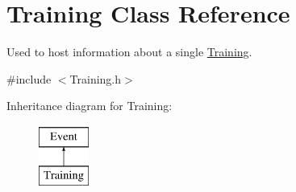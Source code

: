 \hypertarget{class_training}{}\section{Training Class Reference}
\label{class_training}


Used to host information about a single \hyperlink{class_training}{Training}.  




{\ttfamily \#include $<$Training.\+h$>$}

Inheritance diagram for Training\+:\begin{figure}[H]
\begin{center}
\leavevmode
\includegraphics[height=2.000000cm]{class_training}
\end{center}
\end{figure}
